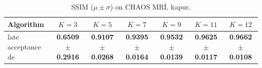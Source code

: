 \begin{table}[htbp]
\centering
\caption{SSIM ($\mu \pm \sigma$) on CHAOS MRI, kapur.}
\label{tab:exp2-kapur-ssim}
\begin{tabular}{lcccccc}
\toprule
Algorithm & $K=3$ & $K=5$ & $K=7$ & $K=9$ & $K=11$ & $K=12$ \\
\midrule
late acceptance de & \textbf{0.6509 $\pm$ 0.2916} & \textbf{0.9107 $\pm$ 0.0268} & \textbf{0.9395 $\pm$ 0.0164} & \textbf{0.9532 $\pm$ 0.0139} & \textbf{0.9625 $\pm$ 0.0117} & \textbf{0.9662 $\pm$ 0.0108} \\
\bottomrule
\end{tabular}
\end{table}